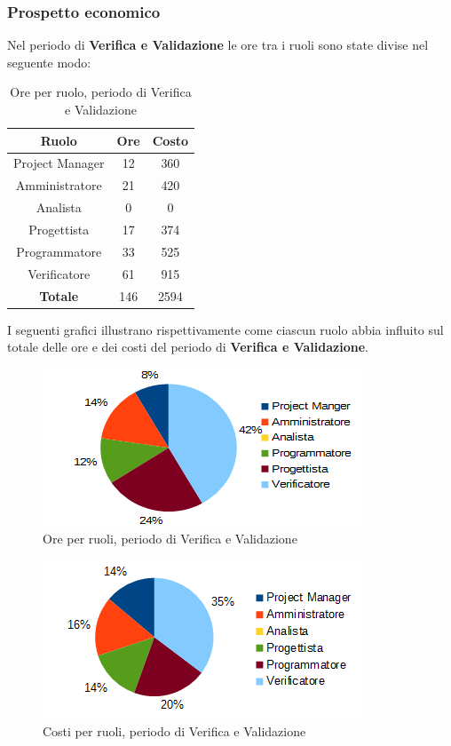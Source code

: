 		\subsubsection{Prospetto economico}
		Nel periodo di \textbf{Verifica e Validazione} le ore tra i ruoli sono state divise nel seguente modo: \\
	\begin{table}[H]
		\centering
		\begin{tabular}{|c|c|c|}
			\hline
			\textbf{Ruolo}		& \textbf{Ore}	& \textbf{Costo} \\
			\hline
			Project Manager		& 12			& 360	\\
			Amministratore		& 21			& 420	\\
			Analista			& 0				& 0	\\
			Progettista			& 17			& 374	\\
			Programmatore		& 33			& 525	\\
			Verificatore		& 61			& 915	\\
			\hline
			\textbf{Totale}		& 146			& 2594	\\
			\hline
		\end{tabular}
		\caption{Ore per ruolo, periodo di Verifica e Validazione}
		\end{table}
	I seguenti grafici illustrano rispettivamente come ciascun ruolo abbia influito sul totale
delle ore e dei costi del periodo di \textbf{Verifica e Validazione}. \\
	\begin{figure}[H]
		\centering
		\includegraphics[scale=1]{immagini/grafici/validazione-torta.png}
		\caption{Ore per ruoli, periodo di Verifica e Validazione}
	\end{figure}
	\begin{figure}[H]
		\centering
		\includegraphics[scale=1]{immagini/grafici/validazione-torta-costo.png}
		\caption{Costi per ruoli, periodo di Verifica e Validazione}
	\end{figure}
